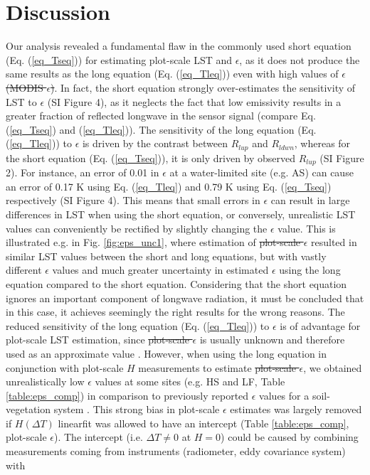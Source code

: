 \documentclass[fleqn,10pt]{wlscirep}
\providecommand{\DIFaddtex}[1]{{\protect\color{blue}\uwave{#1}}} %
\providecommand{\DIFdeltex}[1]{{\protect\color{red}\sout{#1}}}                      %
\providecommand{\DIFaddbegin}{} %
\providecommand{\DIFaddend}{} %
\providecommand{\DIFdelbegin}{} %
\providecommand{\DIFdelend}{} %
\providecommand{\DIFadd}[1]{\texorpdfstring{\DIFaddtex{#1}}{#1}} %
\providecommand{\DIFdel}[1]{\texorpdfstring{\DIFdeltex{#1}}{}} %
\begin{document}
\section{Discussion}
Our analysis revealed a fundamental flaw in the commonly used short equation (Eq. (\ref{eq_Tseq})) for estimating plot-scale LST and \DIFdelbegin \DIFdel{$\epsilon$}\DIFdelend \DIFaddbegin \DIFadd{$\epsilon_{plot}$}\DIFaddend , as it does not produce the same results as the long equation (Eq. (\ref{eq_Tleq})) even with high values of \DIFdelbegin \DIFdel{$\epsilon$ (MODIS $\epsilon$)}\DIFdelend \DIFaddbegin \DIFadd{$\epsilon_{MODIS}$}\DIFaddend . In fact, the short equation strongly over-estimates the sensitivity of LST to $\epsilon$ (SI Figure 4), as it neglects the fact that low emissivity results in a greater fraction of reflected longwave in the sensor signal (compare Eq. (\ref{eq_Tseq}) and (\ref{eq_Tleq})). The sensitivity of the long equation (Eq. (\ref{eq_Tleq})) to $\epsilon$ is driven by the contrast between $R_{lup}$ and $R_{ldwn}$, whereas for the short equation (Eq. (\ref{eq_Tseq})), it is only driven by observed $R_{lup}$ (SI Figure 2). For instance, an error of 0.01 in $\epsilon$ at a water-limited site (e.g. AS) can cause an error of 0.17 K using Eq. (\ref{eq_Tleq}) and 0.79 K using Eq. (\ref{eq_Tseq}) respectively (SI Figure 4). This means that small errors in $\epsilon$ can result in large differences in LST when using the short equation, or conversely, unrealistic LST values can conveniently be rectified by slightly changing the $\epsilon$ value. This is illustrated e.g. in Fig. \ref{fig:eps_unc1}, where estimation of \DIFdelbegin \DIFdel{plot-scale $\epsilon$ }\DIFdelend \DIFaddbegin \DIFadd{$\epsilon_{plot}$ }\DIFaddend resulted in similar LST values between the short and long equations, but with vastly different $\epsilon$ values and much greater uncertainty in estimated $\epsilon$ using the long equation compared to the short equation. Considering that the short equation ignores an important component of longwave radiation, it must be concluded that in this case, it achieves seemingly the right results for the wrong reasons. The reduced sensitivity of the long equation (Eq. (\ref{eq_Tleq})) to $\epsilon$ is of advantage for plot-scale LST estimation, since \DIFdelbegin \DIFdel{plot-scale $\epsilon$ }\DIFdelend \DIFaddbegin \DIFadd{$\epsilon_{plot}$ }\DIFaddend is usually unknown and therefore used as an approximate value \cite{mallick2018bridging}. However, when using the long equation in conjunction with plot-scale $H$ measurements to estimate \DIFdelbegin \DIFdel{plot-scale $\epsilon$}\DIFdelend \DIFaddbegin \DIFadd{$\epsilon_{plot}$}\DIFaddend , we obtained unrealistically low $\epsilon$ values at some sites (e.g. HS and LF, Table \ref{table:eps_comp}) in comparison to previously reported $\epsilon$ values for a soil-vegetation system \cite{sugita1996optimal,snyder1998classification}. This strong bias in plot-scale $\epsilon$ estimates was largely removed if  $H(\Delta T)$ linearfit was allowed to have an intercept (Table \ref{table:eps_comp}, plot-scale $\epsilon$). The intercept (i.e. $\Delta T \ne 0$ at $H=0$) could be caused by combining measurements coming from instruments (radiometer, eddy covariance system) with 
\end{document}
